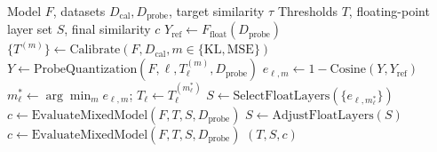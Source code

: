\documentclass[11pt]{article}
\begin{document}
\begin{minipage}{17cm}
\begin{algorithm}[H]
\caption{Calibration and Mixed-Precision Selection}
\begin{algorithmic}[1]
\Require Model $F$, datasets $D_{\mathrm{cal}},D_{\mathrm{probe}}$, target similarity $\tau$
\Ensure Thresholds $T$, floating-point layer set $S$, final similarity $c$
\State $Y_{\mathrm{ref}} \gets F_{\mathrm{float}}(D_{\mathrm{probe}})$
\State $\{T^{(m)}\} \gets \mathrm{Calibrate}(F,D_{\mathrm{cal}},m \in \{\mathrm{KL},\mathrm{MSE}\})$
        \State $Y \gets \mathrm{ProbeQuantization}(F,\ell,T_{\ell}^{(m)},D_{\mathrm{probe}})$
        \State $e_{\ell,m} \gets 1-\mathrm{Cosine}(Y,Y_{\mathrm{ref}})$
    \EndFor
    \State $m_{\ell}^{*} \gets \arg\min_m e_{\ell,m}$; $T_{\ell} \gets T_{\ell}^{(m_{\ell}^{*})}$
\EndFor
\State $S \gets \mathrm{SelectFloatLayers}(\{e_{\ell,m_{\ell}^{*}}\})$
\State $c \gets \mathrm{EvaluateMixedModel}(F,T,S,D_{\mathrm{probe}})$
    \State $S \gets \mathrm{AdjustFloatLayers}(S)$
    \State $c \gets \mathrm{EvaluateMixedModel}(F,T,S,D_{\mathrm{probe}})$
\EndWhile
\State \Return $(T,S,c)$
\end{algorithmic}
\end{algorithm}
\end{minipage}
\end{document}
